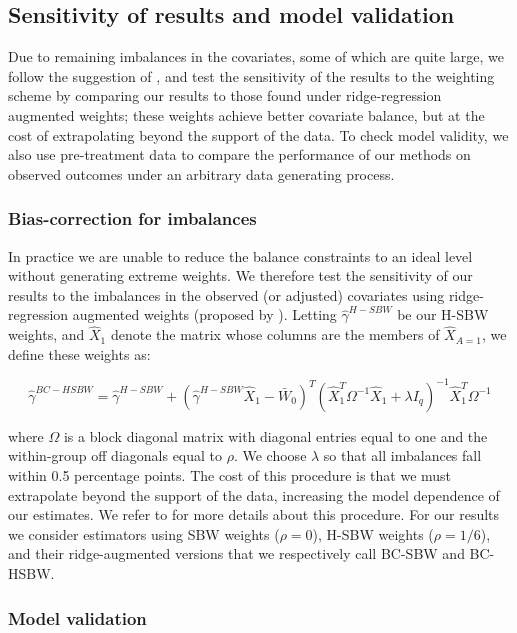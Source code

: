 \documentclass[aoas]{imsart}
\theoremstyle{plain}
\theoremstyle{remark}
\begin{document}
\subsection{Sensitivity of results and model validation}

Due to remaining imbalances in the covariates, some of which are quite large, we follow the suggestion of \cite{ben2021augmented}, and test the sensitivity of the results to the weighting scheme by comparing our results to those found under ridge-regression augmented weights; these weights achieve better covariate balance, but at the cost of extrapolating beyond the support of the data. To check model validity, we also use pre-treatment data to compare the performance of our methods on observed outcomes under an arbitrary data generating process. 

\subsubsection{Bias-correction for imbalances}

In practice we are unable to reduce the balance constraints to an ideal level without generating extreme weights. We therefore test the sensitivity of our results to the imbalances in the observed (or adjusted) covariates using ridge-regression augmented weights (proposed by \cite{ben2021augmented}). Letting $\hat{\gamma}^{H-SBW}$ be our H-SBW weights, and $\hat{X}_1$ denote the matrix whose columns are the members of $\hat{X}_{A=1}$, we define these weights as:

\begin{equation}
\hat{\gamma}^{BC-HSBW} = \hat{\gamma}^{H-SBW} + (\hat{\gamma}^{H-SBW}\hat{X}_1 - \bar{W}_0)^T(\hat{X}_1^T\Omega^{-1}\hat{X}_1 + \lambda I_q)^{-1}\hat{X}_1^T\Omega^{-1}
\end{equation}

where $\Omega$ is a block diagonal matrix with diagonal entries equal to one and the within-group off diagonals equal to $\rho$. We choose $\lambda$ so that all imbalances fall within 0.5 percentage points. The cost of this procedure is that we must extrapolate beyond the support of the data, increasing the model dependence of our estimates. We refer to \cite{ben2021augmented} for more details about this procedure. For our results we consider estimators using SBW weights ($\rho = 0$), H-SBW weights ($\rho = 1/6$), and their ridge-augmented versions that we respectively call BC-SBW and BC-HSBW. 

\subsubsection{Model validation}
\end{document}
